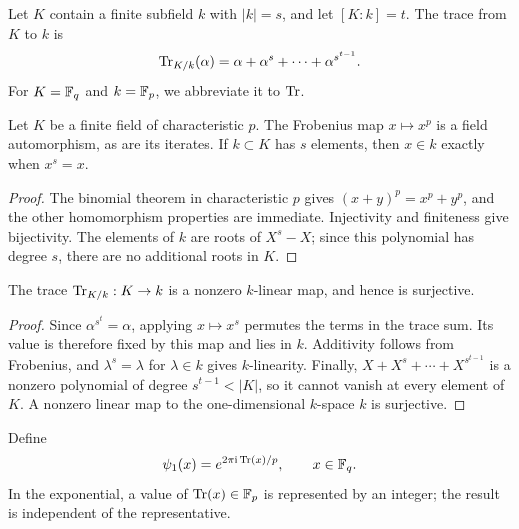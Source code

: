\begin{defn}
\label{notation-26}
Let $K$ contain a finite subfield $k$ with $|k|=s$, and let $[K:k]=t$.
The trace from $K$ to $k$ is
\[
 \operatorname{Tr}_{K/k}(\alpha)=\alpha+\alpha^s+\cdots+\alpha^{s^{t-1}}.
\]
For $K=\mathbb{F}_q$ and $k=\mathbb{F}_p$, we abbreviate it to $\operatorname{Tr}$.
\end{defn}


\begin{prop}
Let $K$ be a finite field of characteristic $p$.
The Frobenius map $x\mapsto x^p$ is a field automorphism, as are its iterates.
If $k\subset K$ has $s$ elements, then $x\in k$ exactly when $x^s=x$.
\end{prop}
\begin{proof}
The binomial theorem in characteristic $p$ gives
$(x+y)^p=x^p+y^p$, and the other homomorphism properties are immediate.
Injectivity and finiteness give bijectivity. The elements of $k$ are roots
of $X^s-X$; since this polynomial has degree $s$, there are no additional
roots in $K$.
\end{proof}


\begin{prop}
The trace $\operatorname{Tr}_{K/k}:K\to k$ is a nonzero $k$-linear map, and hence is
surjective.
\end{prop}
\begin{proof}
Since $\alpha^{s^t}=\alpha$, applying $x\mapsto x^s$ permutes the terms in
the trace sum. Its value is therefore fixed by this map and lies in $k$.
Additivity follows from Frobenius, and $\lambda^s=\lambda$ for $\lambda\in k$
gives $k$-linearity. Finally,
$X+X^s+\cdots+X^{s^{t-1}}$ is a nonzero polynomial of degree
$s^{t-1}<|K|$, so it cannot vanish at every element of $K$.
A nonzero linear map to the one-dimensional $k$-space $k$ is surjective.
\end{proof}


\begin{defn}
\label{defn-character-additive-canonical}\label{notation-27}
Define
\[
 \psi_1(x)=e^{2\pi\mathrm{i}\operatorname{Tr}(x)/p},\qquad x\in\mathbb{F}_q.
\]
In the exponential, a value of $\operatorname{Tr}(x)\in\mathbb{F}_p$ is represented by an integer;
the result is independent of the representative.
\end{defn}


